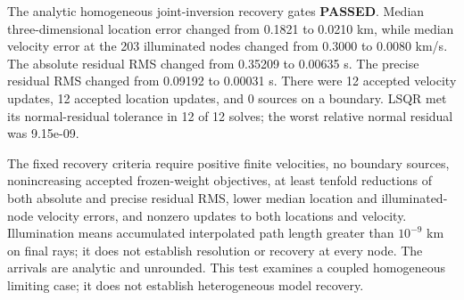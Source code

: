 The analytic homogeneous joint-inversion recovery gates \textbf{PASSED}. Median three-dimensional location error changed from 0.1821 to 0.0210 km, while median velocity error at the 203 illuminated nodes changed from 0.3000 to 0.0080 km/s. The absolute residual RMS changed from 0.35209 to 0.00635 s. The precise residual RMS changed from 0.09192 to 0.00031 s. There were 12 accepted velocity updates, 12 accepted location updates, and 0 sources on a boundary. LSQR met its normal-residual tolerance in 12 of 12 solves; the worst relative normal residual was 9.15e-09.

The fixed recovery criteria require positive finite velocities, no boundary sources, nonincreasing accepted frozen-weight objectives, at least tenfold reductions of both absolute and precise residual RMS, lower median location and illuminated-node velocity errors, and nonzero updates to both locations and velocity. Illumination means accumulated interpolated path length greater than $10^{-9}$ km on final rays; it does not establish resolution or recovery at every node. The arrivals are analytic and unrounded. This test examines a coupled homogeneous limiting case; it does not establish heterogeneous model recovery.
